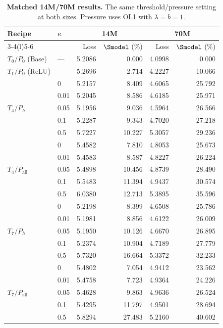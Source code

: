 \begin{table}[!htbp]
\centering\small
\setlength{\tabcolsep}{6pt}
\renewcommand{\arraystretch}{1.05}
\caption{\textbf{Matched 14M/70M results.} The same threshold/pressure setting at both sizes. Pressure uses OL1 with $\lambda=b=1$.}
\label{tab:endpoints-14m-70m}
\begin{tabular}{@{}llrrrr@{}}
\toprule
\multirow{2}{*}{Recipe} & \multirow{2}{*}{$\kappa$} & \multicolumn{2}{c}{14M} & \multicolumn{2}{c}{70M} \\
\cmidrule(lr){3-4}\cmidrule(l){5-6}
 & & Loss & $\Smodel$ (\%) & Loss & $\Smodel$ (\%) \\
\midrule
$T_0/P_{0}$ (Base) & --- & 5.2086 & 0.000 & 4.0998 & 0.000 \\
\midrule
$T_1/P_{0}$ (ReLU) & --- & 5.2696 & 2.714 & 4.2227 & 10.066 \\
\midrule
\multirow{5}{*}{$T_4/P_{h}$} & 0 & 5.2157 & 8.409 & 4.6065 & 25.792 \\
 & 0.01 & 5.2045 & 8.586 & 4.6185 & 25.971 \\
 & 0.05 & 5.1956 & 9.036 & 4.5964 & 26.566 \\
 & 0.1 & 5.2287 & 9.343 & 4.7020 & 27.218 \\
 & 0.5 & 5.7227 & 10.227 & 5.3057 & 29.236 \\
\midrule
\multirow{5}{*}{$T_4/P_{\mathrm{all}}$} & 0 & 5.4582 & 7.810 & 4.8053 & 25.673 \\
 & 0.01 & 5.4583 & 8.587 & 4.8227 & 26.224 \\
 & 0.05 & 5.4898 & 10.456 & 4.8739 & 28.490 \\
 & 0.1 & 5.5483 & 11.394 & 4.9437 & 30.574 \\
 & 0.5 & 6.0380 & 12.713 & 5.3895 & 35.596 \\
\midrule
\multirow{5}{*}{$T_7/P_{h}$} & 0 & 5.2198 & 8.399 & 4.6508 & 25.786 \\
 & 0.01 & 5.1981 & 8.856 & 4.6122 & 26.009 \\
 & 0.05 & 5.1950 & 10.126 & 4.6670 & 26.895 \\
 & 0.1 & 5.2374 & 10.904 & 4.7189 & 27.779 \\
 & 0.5 & 5.7320 & 16.664 & 5.3372 & 32.233 \\
\midrule
\multirow{5}{*}{$T_7/P_{\mathrm{all}}$} & 0 & 5.4802 & 7.054 & 4.9412 & 23.562 \\
 & 0.01 & 5.4758 & 7.723 & 4.9364 & 24.226 \\
 & 0.05 & 5.4628 & 9.863 & 4.9636 & 26.524 \\
 & 0.1 & 5.4295 & 11.797 & 4.9501 & 28.694 \\
 & 0.5 & 5.8294 & 27.483 & 5.2160 & 40.602 \\
\bottomrule
\end{tabular}
\end{table}
